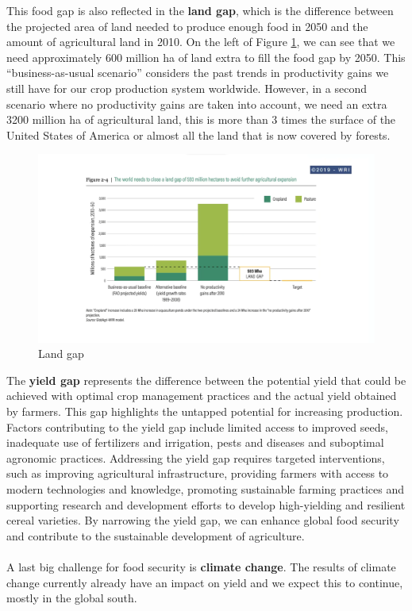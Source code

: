 \documentclass[../summary.tex]{subfiles}
\begin{document}
	This food gap is also reflected in the \textbf{land gap}, which is the difference between the projected area of land needed to produce enough food in 2050 and the amount of agricultural land in 2010. On the left of Figure \ref{fig:land_gap}, we can see that we need approximately 600 million ha of land extra to fill the food gap by 2050. This “business-as-usual scenario” considers the past trends in productivity gains we still have for our crop production system worldwide. However, in a second scenario where no productivity gains are taken into account, we need an extra 3200 million ha of agricultural land, this is more than 3 times the surface of the United States of America or almost all the land that is now covered by forests.
	\\
	\begin{figure}[htbp]
		\centering
		\includegraphics[width=1\linewidth]{images/6-land-gap.png}
		\caption{Land gap}
		\label{fig:land_gap}
	\end{figure}
	
	The \textbf{yield gap} represents the difference between the potential yield that could be achieved with optimal crop management practices and the actual yield obtained by farmers. This gap highlights the untapped potential for increasing production. Factors contributing to the yield gap include limited access to improved seeds, inadequate use of fertilizers and irrigation, pests and diseases and suboptimal agronomic practices. Addressing the yield gap requires targeted interventions, such as improving agricultural infrastructure, providing farmers with access to modern technologies and knowledge, promoting sustainable farming practices and supporting research and development efforts to develop high-yielding and resilient cereal varieties. By narrowing the yield gap, we can enhance global food security and contribute to the sustainable development of agriculture.
	\\\\
	A last big challenge for food security is \textbf{climate change}. The results of climate change currently already have an impact on yield and we expect this to continue, mostly in the global south.
	\newpage
	
\end{document}
